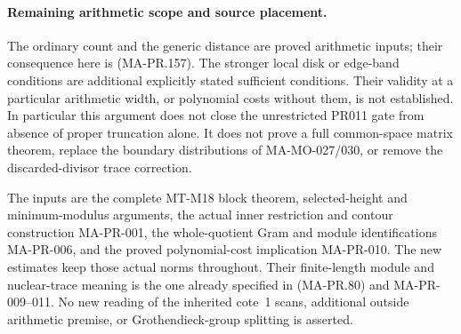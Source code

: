 \paragraph{Remaining arithmetic scope and source placement.}
The ordinary count and the generic distance are
proved arithmetic inputs; their consequence here
is (MA-PR.157).  The stronger local disk or edge-band
conditions are additional explicitly stated sufficient
conditions.  Their validity at a particular arithmetic
width, or polynomial costs without them, is not
established.  In particular this argument does not
close the unrestricted PR011 gate from absence of
proper truncation alone.  It does not prove a
full common-space matrix theorem, replace the
boundary distributions of MA-MO-027/030, or remove
the discarded-divisor trace correction.

The inputs are the complete MT-M18 block theorem,
selected-height and minimum-modulus arguments,
the actual inner restriction and contour construction
MA-PR-001, the whole-quotient Gram and module
identifications MA-PR-006, and the proved
polynomial-cost implication MA-PR-010.
The new estimates keep those actual norms throughout.
Their finite-length module and nuclear-trace meaning
is the one already specified in (MA-PR.80) and
MA-PR-009--011.  No new reading of the inherited
cote~1 scans, additional outside arithmetic premise,
or Grothendieck-group splitting is asserted.
